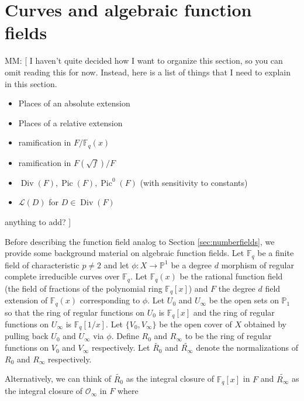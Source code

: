 \documentclass{dcthesis}
\newcommand{\PP}{\mathbb P}
\newcommand{\mm}[1]{{\color{blue} \sf MM: [#1]}}
\newcommand{\wt}[1]{\widetilde{#1}}
\newcommand{\FF}{\mathbb{F}}
\DeclareMathOperator{\Div}{Div}
\DeclareMathOperator{\Pic}{Pic}
\numberwithin{equation}{section}
\theoremstyle{definition}
\theoremstyle{remark}
\begin{document}
{{  \section{Curves and algebraic function fields}{
    \label{sec:algebraicfunctionfields}
    \mm{
      I haven't quite decided how I want to organize
      this section, so you can omit reading this for
      now.
      Instead, here is a list of things
      that I need to explain in this section.
      \begin{itemize}
        \item
          Places of an absolute extension
        \item
          Places of a relative extension
        \item
          ramification in
          $F/\FF_q(x)$
        \item
          ramification in
          $F(\sqrt{f})/F$
        \item
          $\Div(F),\Pic(F),\Pic^0(F)$
          (with sensitivity to constants)
        \item
          $\mathscr{L}(D)$
          for $D\in\Div(F)$
      \end{itemize}
      anything to add?
    }
    Before describing the function field
    analog to
    Section \ref{sec:numberfields},
    we provide some background material on
    algebraic function fields.
    Let $\FF_q$ be a finite field of
    characteristic $p\neq 2$
    and let $\phi\colon X\to\PP^1$
    be a degree $d$ morphism of
    regular complete irreducible curves
    over $\FF_q$.
    Let $\FF_q(x)$ be the rational function
    field (the field of fractions
    of the polynomial ring $\FF_q[x]$)
    and $F$ the degree $d$ field extension
    of $\FF_q(x)$ corresponding to $\phi$.
    Let $U_0$ and $U_\infty$ be the open sets
    on $\PP_1$ so that
    the ring of regular functions on $U_0$
    is $\FF_q[x]$ and the ring of
    regular functions on $U_\infty$ is
    $\FF_q[1/x]$.
    Let $\{V_0,V_\infty\}$ be the open cover
    of $X$ obtained by pulling back $U_0$ and
    $U_\infty$ via $\phi$.
    Define $R_0$ and $R_\infty$ to be the ring
    of regular functions on $V_0$ and $V_\infty$
    respectively.
    Let $\wt{R_0}$ and $\wt{R_\infty}$
    denote the normalizations of $R_0$ and
    $R_\infty$ respectively.
    \par
    Alternatively,
    we can think of $\wt{R_0}$ as the integral
    closure of $\FF_q[x]$ in $F$
    and $\wt{R_\infty}$ as the integral closure
    of $\mathcal{O}_\infty$ in $F$
    where
}}}
\end{document}
